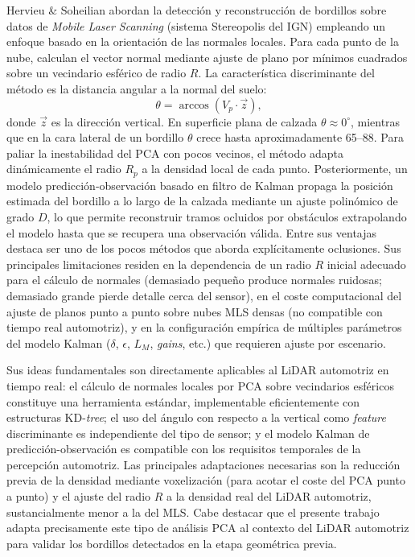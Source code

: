 Hervieu \& Soheilian abordan la detección y reconstrucción de bordillos
sobre datos de \textit{Mobile Laser Scanning} (sistema Stereopolis del
IGN) empleando un enfoque basado en la orientación de las normales
locales. Para cada punto de la nube, calculan el vector normal mediante
ajuste de plano por mínimos cuadrados sobre un vecindario esférico de
radio $R$. La característica discriminante del método es la distancia
angular a la normal del suelo:
\begin{equation}
    \theta = \arccos \left( V_p \cdot \vec{z} \right),
\end{equation}
donde $\vec{z}$ es la dirección vertical. En superficie plana de
calzada $\theta \approx 0^{\circ}$, mientras que en la cara lateral de
un bordillo $\theta$ crece hasta aproximadamente 65--88\textdegree. Para
paliar la inestabilidad del PCA con pocos vecinos, el método adapta
dinámicamente el radio $R_p$ a la densidad local de cada punto.
Posteriormente, un modelo predicción-observación basado en filtro de
Kalman propaga la posición estimada del bordillo a lo largo de la
calzada mediante un ajuste polinómico de grado $D$, lo que permite
reconstruir tramos ocluidos por obstáculos extrapolando el modelo hasta
que se recupera una observación válida. Entre sus ventajas destaca ser
uno de los pocos métodos que aborda explícitamente oclusiones. Sus
principales limitaciones residen en la dependencia de un radio $R$
inicial adecuado para el cálculo de normales (demasiado pequeño produce
normales ruidosas; demasiado grande pierde detalle cerca del sensor),
en el coste computacional del ajuste de planos punto a punto sobre
nubes MLS densas (no compatible con tiempo real automotriz), y en la
configuración empírica de múltiples parámetros del modelo Kalman
($\delta$, $\epsilon$, $L_M$, \textit{gains}, etc.) que requieren
ajuste por escenario.

Sus ideas fundamentales son directamente aplicables al LiDAR automotriz
en tiempo real: el cálculo de normales locales por PCA sobre
vecindarios esféricos constituye una herramienta estándar,
implementable eficientemente con estructuras KD-\textit{tree}; el uso
del ángulo con respecto a la vertical como \textit{feature}
discriminante es independiente del tipo de sensor; y el modelo Kalman
de predicción-observación es compatible con los requisitos temporales
de la percepción automotriz. Las principales adaptaciones necesarias
son la reducción previa de la densidad mediante voxelización (para
acotar el coste del PCA punto a punto) y el ajuste del radio $R$ a la
densidad real del LiDAR automotriz, sustancialmente menor a la del MLS.
Cabe destacar que el presente trabajo adapta precisamente este tipo de
análisis PCA al contexto del LiDAR automotriz para validar los
bordillos detectados en la etapa geométrica previa.


